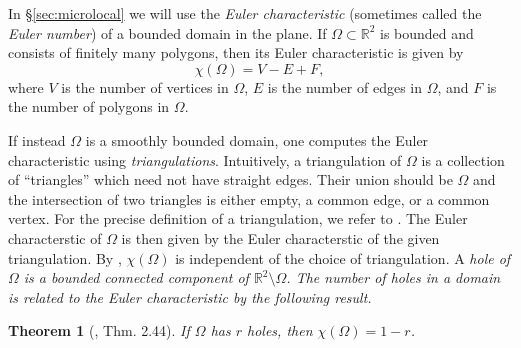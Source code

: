 \documentclass{amsart}
\newtheorem{theorem}{Theorem}[section]
\theoremstyle{definition}
\newcommand*{\R}{\mathbb{R}}
\begin{document}
In \S\ref{sec:microlocal} we will use the \textit{Euler characteristic} (sometimes called the \textit{Euler number}) of a bounded domain in the plane. If $\Omega \subset \R^2$ is bounded and consists of finitely many polygons, then its Euler characteristic is given by
\begin{equation} \label{eq:euler_char}
        \chi(\Omega) = V - E + F,
    \end{equation}
where $V$ is the number of vertices in $\Omega$, $E$ is the number of edges in $\Omega$, and $F$ is the number of polygons in $\Omega$.

If instead $\Omega$ is a smoothly bounded domain, one computes the Euler characteristic using \textit{triangulations}. Intuitively, a triangulation of $\Omega$ is a collection of ``triangles'' which need not have straight edges. Their union should be $\Omega$ and the intersection of two triangles is either empty, a common edge, or a common vertex. For the precise definition of a triangulation, we refer to \cite[Definition 13.4.1]{pressley2010elementary}. The Euler characterstic of $\Omega$ is then given by the Euler characterstic of the given triangulation. By \cite[Corollary 13.4.6]{pressley2010elementary}, $\chi(\Omega)$ is independent of the choice of triangulation. A \em hole \em of $\Omega$ is a bounded connected component of $\R^2 \setminus \Omega$. The number of holes in a domain is related to the Euler characteristic by the following result. 

\begin{theorem}[\cite{hatcher2005algebraic}, Thm. 2.44] \label{theorem:holes}
    If $\Omega$ has $r$ holes, then $\chi(\Omega) = 1-r$.
\end{theorem}
\end{document}
